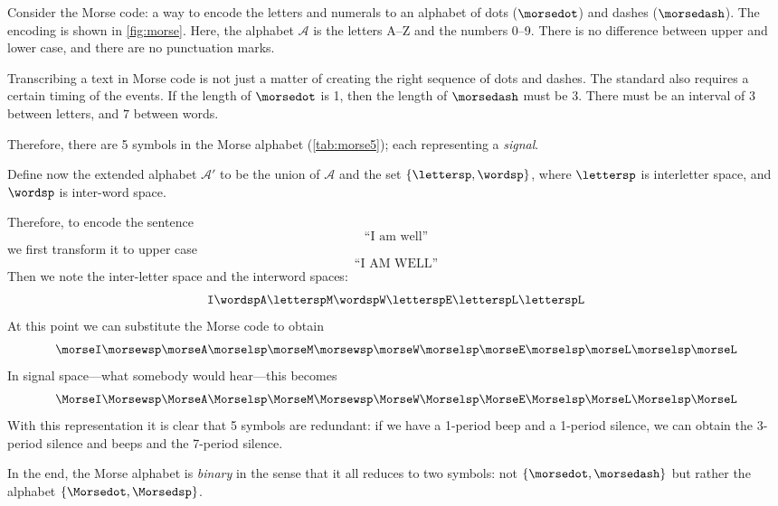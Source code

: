 \begin{example}
  Consider the Morse code:  a way to encode the letters and numerals to an alphabet
  of dots ($\morsedot$) and dashes ($\morsedash$). The encoding is shown in \cref{fig:morse}.
  Here, the alphabet $\mathcal{A}$ is the letters A--Z and the numbers 0--9.
  There is no difference between upper and lower case, and there are no punctuation marks.

  Transcribing a text in Morse code is not just a matter of creating the right sequence of dots and dashes. The standard also requires a certain timing of the events. If the length of $\morsedot$ is 1, then the length of $\morsedash$ must be 3. There must be an interval of $3$ between letters, and $7$ between words.

  Therefore, there are 5 symbols in the Morse alphabet (\cref{tab:morse5}); each representing a \emph{signal}.


  Define now the extended alphabet  $\mathcal{A}'$ to be the union of $\mathcal{A}$ and the set $\{\lettersp, \wordsp\}$, where $\lettersp$ is interletter space, and $\wordsp$ is inter-word space.

  Therefore, to encode the sentence
  \begin{equation}
    \text{``I am well''}
  \end{equation}
   we first transform it to upper case
   \begin{equation}
    \text{``I AM WELL''}
    \end{equation}
   Then we note the inter-letter space and the interword spaces:
  \begin{equation}
      \texttt{I} \wordsp \texttt{A} \lettersp \texttt{M} \wordsp \texttt{W} \lettersp
       \texttt{E} \lettersp \texttt{L} \lettersp \texttt{L}
  \end{equation}
  At this point we can substitute the Morse code to obtain
    \begin{equation}
      \morseI \morsewsp \morseA \morselsp \morseM \morsewsp \morseW \morselsp \morseE \morselsp \morseL \morselsp \morseL
  \end{equation}
    In signal space---what somebody would hear---this becomes
    \begin{equation}
      \MorseI \Morsewsp \MorseA \Morselsp \MorseM \Morsewsp \MorseW \Morselsp \MorseE \Morselsp \MorseL \Morselsp \MorseL
  \end{equation}
  With this representation it is clear that 5 symbols are redundant: if we have a 1-period beep and a 1-period silence, we can obtain the 3-period silence and beeps and the 7-period silence.

  In the end, the Morse alphabet is \emph{binary} in the sense that it all reduces to two symbols: not $\{\morsedot, \morsedash\}$ but rather the alphabet $\{\Morsedot, \Morsedsp\}$.
\end{example}

